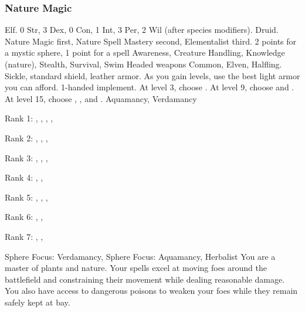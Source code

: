         \subsubsection{Nature Magic}
             Elf.
             0 Str, 3 Dex, 0 Con, 1 Int, 3 Per, 2 Wil (after species modifiers).
             Druid.
             Nature Magic first, Nature Spell Mastery second, Elementalist third.
             2 points for a mystic sphere, 1 point for a spell
             Awareness, Creature Handling, Knowledge (nature), Stealth, Survival, Swim
             Headed weapons
             Common, Elven, Halfling.
             Sickle, standard shield, leather armor. As you gain levels, use the best light armor you can afford.
             1-handed implement.
                At level 3, choose .
                At level 9, choose  and .
                At level 15, choose , , and .
             Aquamancy, Verdamancy
            \begin{raggeditemize}
                \item Rank 1: , , , , 
                \item Rank 2: , , , 
                \item Rank 3: , , , 
                \item Rank 4: , , 
                \item Rank 5: , , , 
                \item Rank 6: , , 
                \item Rank 7: , , 
            \end{raggeditemize}
             Sphere Focus: Verdamancy, Sphere Focus: Aquamancy, Herbalist
             You are a master of plants and nature.
            Your spells excel at moving foes around the battlefield and constraining their movement while dealing reasonable damage.
            You also have access to dangerous poisons to weaken your foes while they remain safely kept at bay.

